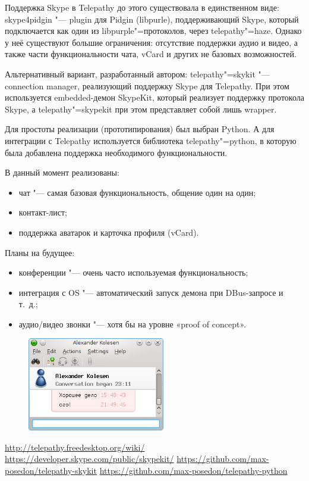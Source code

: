 \documentclass[10pt, a5paper]{article}
\begin{document}
Поддержка Skype в Telepathy до этого существовала в единственном виде: skype4pidgin "--- plugin для Pidgin (libpurle), поддерживающий Skype, который подключается как один из libpurple"=протоколов, через telepathy"=haze. Однако у неё существуют большие ограничения: отсутствие поддержки аудио и видео, а также части функциональности чата, vCard и других не базовых возможностей.

Альтернативный вариант, разработанный автором: telepathy"=sky\-kit "--- connection manager, реализующий поддержку Skype для Telepathy. При этом используется embedded-демон SkypeKit, который реализует поддержку протокола Skype, а telepathy"=skypekit при этом представляет собой лишь wrapper.

Для простоты реализации (прототипирования) был выбран Python. А для интеграции с Telepathy используется библиотека telepathy"=python, в которую была добавлена поддержка необходимого функциональности.

В данный момент реализованы:
\begin{itemize}
\item чат "--- самая базовая функциональность, общение один на один;
\item контакт-лист;
\item поддержка аватарок и карточка профиля (vCard).
\end{itemize}

Планы на будущее:
\begin{itemize}
\item конференции "--- очень часто используемая функциональность;
\item интеграция с OS "--- автоматический запуск демона при DBus-запросе и т.~д.;
\item аудио/видео звонки "--- хотя бы на уровне «proof of concept».
\end{itemize}
\begin{figure}[h]
  \centering
  \includegraphics[width=6cm]{101_2013_w_Melnikau_ktpskype}
\end{figure}

\let\saverefname=\refname%
\def\refname{Полезные ссылки}%
\begin{thebibliography}{9}
 \url{http://telepathy.freedesktop.org/wiki/}
 \url{https://developer.skype.com/public/skypekit/}
 \url{https://github.com/max-posedon/telepathy-skykit}
 \url{https://github.com/max-posedon/telepathy-python}
\end{thebibliography}
\let\refname=\saverefname%
\end{document}
